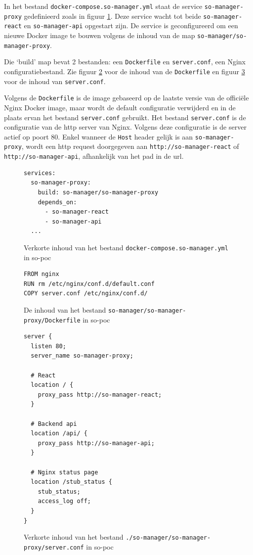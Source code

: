 \documentclass[a4paper,12pt]{report}
\begin{document}
In het bestand \lstinline|docker-compose.so-manager.yml| staat de service \lstinline|so-manager-proxy| gedefinieerd zoals in figuur \ref{fig:proxy-voorbeeld-compose}.
Deze service wacht tot beide \lstinline|so-manager-react| en \lstinline|so-manager-api| opgestart zijn.
De service is geconfigureerd om een nieuwe Docker image te bouwen volgens de inhoud van de map \lstinline|so-manager/so-manager-proxy|.

Die `build' map bevat 2 bestanden: een \lstinline|Dockerfile| en \lstinline|server.conf|, een Nginx configuratiebestand.
Zie figuur \ref{fig:proxy-voorbeeld-dockerfile} voor de inhoud van de \lstinline|Dockerfile| en figuur \ref{fig:proxy-voorbeeld-server-conf} voor de inhoud van \lstinline|server.conf|.

Volgens de \lstinline|Dockerfile| is de image gebaseerd op de laatste versie van de officiële Nginx Docker image, maar wordt de default configuratie verwijderd en in de plaats ervan het bestand \lstinline|server.conf| gebruikt.
Het bestand \lstinline|server.conf| is de configuratie van de http server van Nginx.
Volgens deze configuratie is de server actief op poort 80.
Enkel wanneer de \lstinline|Host| header gelijk is aan \lstinline|so-manager-proxy|, wordt een http request doorgegeven aan \lstinline|http://so-manager-react| of \lstinline|http://so-manager-api|, afhankelijk van het pad in de url.

\begin{figure}[H]
  \begin{lstlisting}
services:
  so-manager-proxy:
    build: so-manager/so-manager-proxy
    depends_on:
      - so-manager-react
      - so-manager-api
  ...
  \end{lstlisting}
  \caption{Verkorte inhoud van het bestand \lstinline|docker-compose.so-manager.yml| in so-poc}
  \label{fig:proxy-voorbeeld-compose}
\end{figure}

\begin{figure}[H]
  \begin{lstlisting}
FROM nginx
RUN rm /etc/nginx/conf.d/default.conf
COPY server.conf /etc/nginx/conf.d/
  \end{lstlisting}
  \caption{De inhoud van het bestand \lstinline|so-manager/so-manager-proxy/Dockerfile| in so-poc}
  \label{fig:proxy-voorbeeld-dockerfile}
\end{figure}

\begin{figure}[H]
  \begin{lstlisting}
server {
  listen 80;
  server_name so-manager-proxy;

  # React
  location / {
    proxy_pass http://so-manager-react;
  }

  # Backend api
  location /api/ {
    proxy_pass http://so-manager-api;
  }

  # Nginx status page
  location /stub_status {
    stub_status;
    access_log off;
  }
}
  \end{lstlisting}
  \caption{Verkorte inhoud van het bestand \lstinline|./so-manager/so-manager-proxy/server.conf| in so-poc}
  \label{fig:proxy-voorbeeld-server-conf}
\end{figure}
\end{document}
